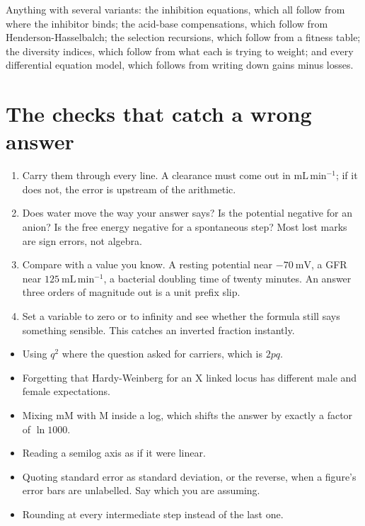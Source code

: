 \begin{keybox}[title={Rebuild these from a principle, never memorise}]
Anything with several variants: the inhibition equations, which all follow from where
the inhibitor binds; the acid-base compensations, which follow from
Henderson-Hasselbalch; the selection recursions, which follow from a fitness table; the
diversity indices, which follow from what each is trying to weight; and every
differential equation model, which follows from writing down gains minus losses.
\end{keybox}

\section{The checks that catch a wrong answer}

\begin{tipbox}[title={TECHNIQUE: four audits, in this order}]
\begin{enumerate}
\item {} Carry them through every line. A clearance must come out in
      $\mathrm{mL\,min^{-1}}$; if it does not, the error is upstream of the arithmetic.
\item {} Does water move the way your answer says? Is the
      potential negative for an anion? Is the free energy negative for a spontaneous
      step? Most lost marks are sign errors, not algebra.
\item {} Compare with a value you know. A resting potential near
      $-70\ \mathrm{mV}$, a GFR near $125\ \mathrm{mL\,min^{-1}}$, a bacterial doubling
      time of twenty minutes. An answer three orders of magnitude out is a unit prefix
      slip.
\item {} Set a variable to zero or to infinity and see whether the formula
      still says something sensible. This catches an inverted fraction instantly.
\end{enumerate}
\end{tipbox}

\begin{warnbox}[title={TRAP: the six errors that cost the most marks}]
\begin{itemize}
\item Using $q^2$ where the question asked for carriers, which is $2pq$.
\item Forgetting that Hardy-Weinberg for an X linked locus has different male and
      female expectations.
\item Mixing $\mathrm{mM}$ with $\mathrm{M}$ inside a log, which shifts the answer by
      exactly a factor of $\ln 1000$.
\item Reading a semilog axis as if it were linear.
\item Quoting standard error as standard deviation, or the reverse, when a figure's
      error bars are unlabelled. Say which you are assuming.
\item Rounding at every intermediate step instead of the last one.
\end{itemize}
\end{warnbox}

